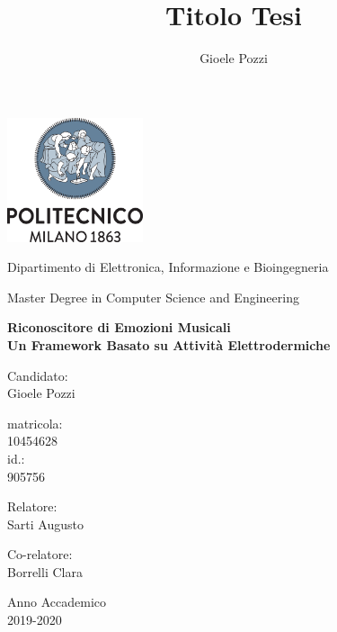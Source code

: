 \documentclass[oneside]{book}
\author{Gioele Pozzi}
\title{Titolo Tesi}
\begin{document}
\centering
\includegraphics[width=4cm]{../img/logo_polimi.png}

\vspace{1cm}
Dipartimento di Elettronica, Informazione e Bioingegneria

\vspace{0.25cm}
Master Degree in Computer Science and Engineering

\vspace{2cm}
\centering

\color{BrickRed}
\Huge
\textbf{
Riconoscitore di Emozioni Musicali\\%
\Large Un Framework Basato su Attività Elettrodermiche}

\normalsize
\vspace{2cm}
\color{black}
\flushright
Candidato:\\Gioele Pozzi

\vspace{0.5cm}
matricola:\\10454628 \\
id.:\\905756

\vspace{0.5cm}
\flushleft
Relatore:\\ Sarti Augusto

\vspace{0.5cm}
Co-relatore:\\ Borrelli Clara



\vfill
\centering
Anno Accademico \\ 2019-2020

\end{document}
